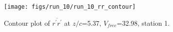 \begin{figure}[H]
\centering
\texttt{[image: figs/run\_10/run\_10\_rr\_contour]}
\caption{Contour plot of $\overline{r^\prime r^\prime}$ at $z/c$=5.37, $V_{free}$=32.98, station 1.}
\label{fig:run_10_rr_contour}
\end{figure}


